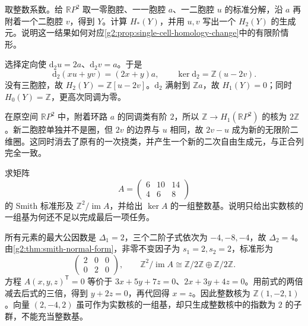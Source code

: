 \begin{exercise}\label{g2:ex:kill-projective-torsion}
	取整数系数。给 \(\mathbb RP^2\) 取一零胞腔、一一胞腔 \(a\)、一二胞腔 \(u\) 的标准分解，沿 \(a\) 再附着一个二胞腔 \(v\)，得到 \(Y\)。计算 \(H_*(Y)\)，并用 \(u,v\) 写出一个 \(H_2(Y)\) 的生成元。说明这一结果如何对应\cref{g2:prop:single-cell-homology-change}中的有限阶情形。
\end{exercise}
\begin{solution}
	选择定向使 \(\mathrm{d}_2u=2a\)、\(\mathrm{d}_2v=a\)。于是
	\[
		\mathrm{d}_2(xu+yv)=(2x+y)a,
		\qquad \ker\mathrm{d}_2=\mathbb Z(u-2v).
	\]
	没有三胞腔，故 \(H_2(Y)=\mathbb Z[u-2v]\)。\(\mathrm{d}_2\) 满射到 \(\mathbb Za\)，故 \(H_1(Y)=0\)；同时 \(H_0(Y)=\mathbb Z\)，更高次同调为零。

	在原空间 \(\mathbb RP^2\) 中，附着环路 \(a\) 的同调类有阶 \(2\)，所以 \(\mathbb Z\to H_1(\mathbb RP^2)\) 的核为 \(2\mathbb Z\)。新二胞腔单独并不是圈，但 \(2v\) 的边界与 \(u\) 相同，故 \(2v-u\) 成为新的无限阶二维圈。这同时消去了原有的一次挠类，并产生一个新的二次自由生成元，与正合列完全一致。
\end{solution}

\begin{exercise}\label{g2:ex:smith-gcd-minors}
	求矩阵
	\[
		A=\begin{pmatrix}6&10&14\\4&6&8\end{pmatrix}
	\]
	的 Smith 标准形及 \(\mathbb Z^2/\operatorname{im}A\)，并给出 \(\ker A\) 的一组整数基。说明只给出实数核的一组基为何还不足以完成最后一项任务。
\end{exercise}
\begin{solution}
	所有元素的最大公因数是 \(\Delta_1=2\)，三个二阶子式依次为 \(-4,-8,-4\)，故 \(\Delta_2=4\)。由\cref{g2:thm:smith-normal-form}，非零不变因子为 \(s_1=2,s_2=2\)，标准形为
	\[
		\begin{pmatrix}2&0&0\\0&2&0\end{pmatrix},\qquad
		\mathbb Z^2/\operatorname{im}A\cong
		\mathbb Z/2\mathbb Z\oplus\mathbb Z/2\mathbb Z.
	\]
	方程 \(A(x,y,z)^{\mathsf T}=0\) 等价于 \(3x+5y+7z=0\)、\(2x+3y+4z=0\)。用前式的两倍减去后式的三倍，得到 \(y+2z=0\)，再代回得 \(x=z\)。因此整数核为 \(\mathbb Z(1,-2,1)\)。向量 \((2,-4,2)\) 虽可作为实数核的一组基，却只生成整数核中的指数为 \(2\) 的子群，不能充当整数基。
\end{solution}

